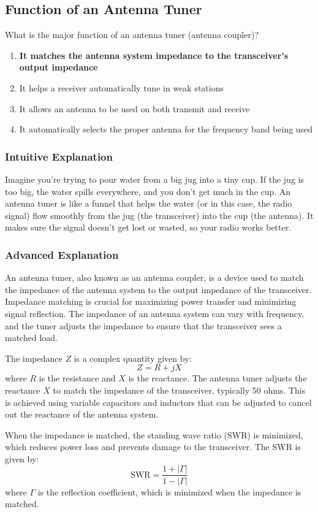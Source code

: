 \subsection{Function of an Antenna Tuner}
\label{T9B04}

\begin{tcolorbox}[colback=gray!10!white,colframe=black!75!black,title=T9B04]
What is the major function of an antenna tuner (antenna coupler)?
\begin{enumerate}[label=\Alph*)]
    \item \textbf{It matches the antenna system impedance to the transceiver's output impedance}
    \item It helps a receiver automatically tune in weak stations
    \item It allows an antenna to be used on both transmit and receive
    \item It automatically selects the proper antenna for the frequency band being used
\end{enumerate}
\end{tcolorbox}

\subsubsection{Intuitive Explanation}
Imagine you're trying to pour water from a big jug into a tiny cup. If the jug is too big, the water spills everywhere, and you don't get much in the cup. An antenna tuner is like a funnel that helps the water (or in this case, the radio signal) flow smoothly from the jug (the transceiver) into the cup (the antenna). It makes sure the signal doesn't get lost or wasted, so your radio works better.

\subsubsection{Advanced Explanation}
An antenna tuner, also known as an antenna coupler, is a device used to match the impedance of the antenna system to the output impedance of the transceiver. Impedance matching is crucial for maximizing power transfer and minimizing signal reflection. The impedance of an antenna system can vary with frequency, and the tuner adjusts the impedance to ensure that the transceiver sees a matched load.

The impedance \( Z \) is a complex quantity given by:
\[ Z = R + jX \]
where \( R \) is the resistance and \( X \) is the reactance. The antenna tuner adjusts the reactance \( X \) to match the impedance of the transceiver, typically 50 ohms. This is achieved using variable capacitors and inductors that can be adjusted to cancel out the reactance of the antenna system.

When the impedance is matched, the standing wave ratio (SWR) is minimized, which reduces power loss and prevents damage to the transceiver. The SWR is given by:
\[ \text{SWR} = \frac{1 + |\Gamma|}{1 - |\Gamma|} \]
where \( \Gamma \) is the reflection coefficient, which is minimized when the impedance is matched.

